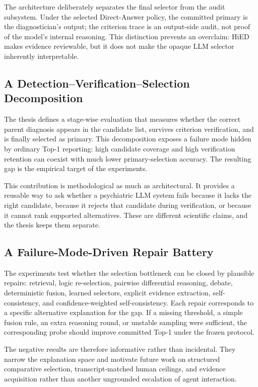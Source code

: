 The architecture deliberately separates the final selector from the audit subsystem. Under the selected Direct-Answer policy, the committed primary is the diagnostician's output; the criterion trace is an output-side audit, not proof of the model's internal reasoning. This distinction prevents an overclaim: HiED makes evidence reviewable, but it does not make the opaque LLM selector inherently interpretable.

\subsection{A Detection--Verification--Selection Decomposition}

The thesis defines a stage-wise evaluation that measures whether the correct parent diagnosis appears in the candidate list, survives criterion verification, and is finally selected as primary. This decomposition exposes a failure mode hidden by ordinary Top-1 reporting: high candidate coverage and high verification retention can coexist with much lower primary-selection accuracy. The resulting gap is the empirical target of the experiments.

This contribution is methodological as much as architectural. It provides a reusable way to ask whether a psychiatric LLM system fails because it lacks the right candidate, because it rejects that candidate during verification, or because it cannot rank supported alternatives. These are different scientific claims, and the thesis keeps them separate.

\subsection{A Failure-Mode-Driven Repair Battery}

The experiments test whether the selection bottleneck can be closed by plausible repairs: retrieval, logic re-selection, pairwise differential reasoning, debate, deterministic fusion, learned selectors, explicit evidence extraction, self-consistency, and confidence-weighted self-consistency. Each repair corresponds to a specific alternative explanation for the gap. If a missing threshold, a simple fusion rule, an extra reasoning round, or unstable sampling were sufficient, the corresponding probe should improve committed Top-1 under the frozen protocol.

The negative results are therefore informative rather than incidental. They narrow the explanation space and motivate future work on structured comparative selection, transcript-matched human ceilings, and evidence acquisition rather than another ungrounded escalation of agent interaction.

